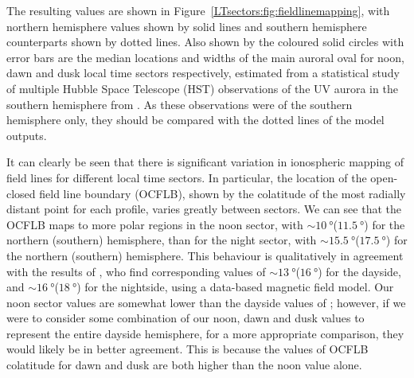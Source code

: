 The resulting values are shown in Figure~\ref{LTsectors:fig:fieldlinemapping}, with northern hemisphere values shown by solid lines and southern hemisphere counterparts shown by dotted lines. Also shown by the coloured solid circles with error bars are the median locations and widths of the main auroral oval for noon, dawn and dusk local time sectors respectively, estimated from a statistical study of multiple Hubble Space Telescope (HST) observations of the UV aurora in the southern hemisphere from \citet{badman2006}. As these observations were of the southern hemisphere only, they should be compared with the dotted lines of the model outputs.

It can clearly be seen that there is significant variation in ionospheric mapping of field lines for different local time sectors. In particular, the location of the open-closed field line boundary (OCFLB), shown by the colatitude of the most radially distant point for each profile, varies greatly between sectors. We can see that the OCFLB maps to more polar regions in the noon sector, with ${\sim}\SI{10}{\degree}$($\SI{11.5}{\degree}$) for the northern (southern) hemisphere, than for the night sector, with ${\sim}\SI{15.5}{\degree}$($\SI{17.5}{\degree}$) for the northern (southern) hemisphere. This behaviour is qualitatively in agreement with the results of \citet{carbary2018}, who find corresponding values of ${\sim}\SI{13}{\degree}$($\SI{16}{\degree}$) for the dayside, and ${\sim}\SI{16}{\degree}$($\SI{18}{\degree}$) for the nightside, using a data-based magnetic field model. Our noon sector values are somewhat lower than the dayside values of \citet{carbary2018}; however, if we were to consider some combination of our noon, dawn and dusk values to represent the entire dayside hemisphere, for a more appropriate comparison, they would likely be in better agreement. This is because the values of OCFLB colatitude for dawn and dusk are both higher than the noon value alone.

